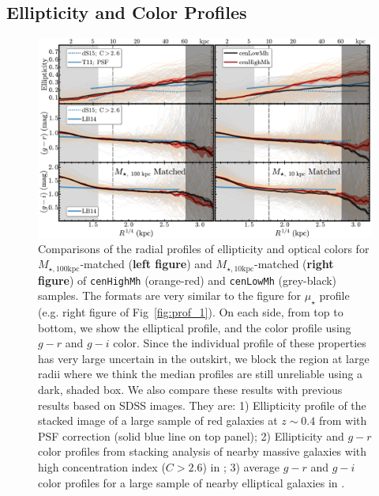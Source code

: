 \documentclass[a4paper,fleqn,usenatbib]{mnras}
\def\rbcg{\texttt{cenHighMh}}
\def\nbcg{\texttt{cenLowMh}}
\def\minn{{$M_{\star,10\mathrm{kpc}}$}}
\def\mtot{{$M_{\star,100\mathrm{kpc}}$}}
\def\mden{{$\mu_{\star}$}}
\begin{document}
\subsection{Ellipticity and Color Profiles}
    \label{ssec:ell_color}
    
  \begin{figure}
      \centering 
      \includegraphics[width=\textwidth]{fig/redbcg_discussion_2}
      \caption{
          Comparisons of the radial profiles of ellipticity and optical colors 
      	  for \mtot{}-matched (\textbf{left figure}) and \minn{}-matched 
      	  (\textbf{right figure}) of \rbcg{} (orange-red) and \nbcg{} (grey-black) samples. 
          The formats are very similar to the figure for \mden{} profile 
          (e.g. right figure of Fig~\ref{fig:prof_1}). 
          On each side, from top to bottom, we show the elliptical profile, and the 
          color profile using $g-r$ and $g-i$ color. 
          Since the individual profile of these properties has very large uncertain in the 
          outskirt, we block the region at large radii where we think the median profiles 
          are still unreliable using a dark, shaded box.
          We also compare these results with previous results based on SDSS images. 
          They are: 
          1) Ellipticity profile of the stacked image of a large sample of red galaxies at 
          $z\sim 0.4$ from \citet{Tal2011} with PSF correction 
          (solid blue line on top panel); 
          2) Ellipticity and $g-r$ color profiles from stacking analysis of nearby massive 
          galaxies with high concentration index ($C>2.6$) in \citet[][blue dash lines 
          on the top and middle panels]{DSouza2014}; 
          3) average $g-r$ and $g-i$ color profiles for a large sample of nearby 
          elliptical galaxies in \citet[][blue, solid lines on the middle and bottom 
          panels]{LaBarbera2010}.
          }
      \label{fig:ell_color}
  \end{figure}
    
\end{document}
